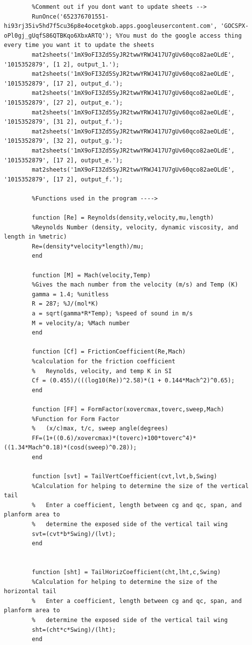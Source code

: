 \documentclass[12pt,A4paper]{article}
\begin{document}
\begin{lstlisting}
		%Comment out if you dont want to update sheets -->
		RunOnce('652376701551-hi93rj35iv5hd7f5cu36p8e4ocetgkob.apps.googleusercontent.com', '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'); %You must do the google access thing every time you want it to update the sheets
		mat2sheets('1mX9oFI3Zd5SyJR2twwYRWJ417U7gUv60qco82aeOLdE', '1015352879', [1 2], output_1.');
		mat2sheets('1mX9oFI3Zd5SyJR2twwYRWJ417U7gUv60qco82aeOLdE', '1015352879', [17 2], output_d.');
		mat2sheets('1mX9oFI3Zd5SyJR2twwYRWJ417U7gUv60qco82aeOLdE', '1015352879', [27 2], output_e.');
		mat2sheets('1mX9oFI3Zd5SyJR2twwYRWJ417U7gUv60qco82aeOLdE', '1015352879', [31 2], output_f.');
		mat2sheets('1mX9oFI3Zd5SyJR2twwYRWJ417U7gUv60qco82aeOLdE', '1015352879', [32 2], output_g.');
		mat2sheets('1mX9oFI3Zd5SyJR2twwYRWJ417U7gUv60qco82aeOLdE', '1015352879', [17 2], output_e.');
		mat2sheets('1mX9oFI3Zd5SyJR2twwYRWJ417U7gUv60qco82aeOLdE', '1015352879', [17 2], output_f.');
		
		%Functions used in the program ---->
		
		function [Re] = Reynolds(density,velocity,mu,length)
		%Reynolds Number (density, velocity, dynamic viscosity, and length in %metric)
		Re=(density*velocity*length)/mu;
		end
		
		function [M] = Mach(velocity,Temp)
		%Gives the mach number from the velocity (m/s) and Temp (K)
		gamma = 1.4; %unitless
		R = 287; %J/(mol*K)
		a = sqrt(gamma*R*Temp); %speed of sound in m/s
		M = velocity/a; %Mach number
		end
		
		function [Cf] = FrictionCoefficient(Re,Mach)
		%calculation for the friction coefficient
		%   Reynolds, velocity, and temp K in SI
		Cf = (0.455)/(((log10(Re))^2.58)*(1 + 0.144*Mach^2)^0.65);
		end
		
		function [FF] = FormFactor(xovercmax,toverc,sweep,Mach)
		%Function for Form Factor
		%   (x/c)max, t/c, sweep angle(degrees) 
		FF=(1+((0.6)/xovercmax)*(toverc)+100*toverc^4)*((1.34*Mach^0.18)*(cosd(sweep)^0.28));
		end
		
		function [svt] = TailVertCoefficient(cvt,lvt,b,Swing)
		%Calculation for helping to determine the size of the vertical tail
		%   Enter a coefficient, length between cg and qc, span, and planform area to
		%   determine the exposed side of the vertical tail wing
		svt=(cvt*b*Swing)/(lvt);
		end
		
		
		function [sht] = TailHorizCoefficient(cht,lht,c,Swing)
		%Calculation for helping to determine the size of the horizontal tail
		%   Enter a coefficient, length between cg and qc, span, and planform area to
		%   determine the exposed side of the vertical tail wing
		sht=(cht*c*Swing)/(lht);
		end
		

\end{lstlisting}
\end{document}
